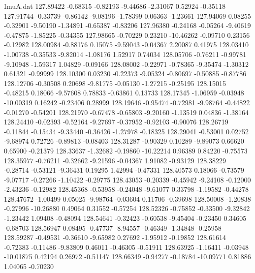 \begin{filecontents}{ImuA.dat}
 127.89422   -0.68315   -0.82193   -9.44686   -2.31067    0.52924   -0.35118
 127.91744   -0.33739   -0.86142   -9.08196   -1.78399    0.06363   -1.23661
 127.94069    0.08255   -0.32901   -9.50190   -1.34891   -0.65387   -0.83206
 127.96380   -0.24168   -0.05264   -9.40619   -0.47875   -1.85225   -0.34355
 127.98665   -0.70229    0.23210  -10.46262   -0.09710    0.23156   -0.12982
 128.00984   -0.88176    0.15075   -9.59043   -0.04367    2.20087    0.41975
 128.03410   -1.00738   -0.35533   -9.82014   -1.08176    1.52917    0.74034
 128.05706   -0.76211   -0.99781   -9.10948   -1.59317    1.04829   -0.09166
 128.08002   -0.22971   -0.78365   -9.35474   -1.30312    0.61321   -0.99999
 128.10300    0.03230   -0.22373   -9.05324   -0.80697   -0.50885   -0.87786
 128.12706   -0.30508    0.20698   -9.81775   -0.05130   -1.27215   -0.25195
 128.15015   -0.48215    0.18066   -9.57608    0.78833   -0.63861    0.13733
 128.17345   -1.06959   -0.03948  -10.00319    0.16242   -0.23406    0.28999
 128.19646   -0.95474   -0.72981   -9.98764   -0.44822   -0.01270   -0.54201
 128.21970   -0.67478   -0.65803   -9.20160   -1.13519    0.04836   -1.38164
 128.24410   -0.02393   -0.52164   -9.27697   -0.37952   -0.92103   -0.90076
 128.26719   -0.11844   -0.15434   -9.33440   -0.36426   -1.27978   -0.18325
 128.29041   -0.53001    0.02752   -9.68974    0.72726   -0.89813   -0.08403
 128.31287   -0.90329    0.10289   -9.89073    0.66620    0.65900   -0.21379
 128.33637   -1.32682   -0.19860  -10.22214    0.96389    0.84220   -0.75573
 128.35977   -0.76211   -0.32662   -9.21596   -0.04367    1.91082   -0.93129
 128.38229   -0.28714   -0.53121   -9.36431    0.19295    1.42994   -0.47331
 128.40573    0.18066   -0.73579   -9.07717   -0.27266   -1.10422   -0.29775
 128.43053   -0.20339   -0.45942   -9.24108   -0.12000   -2.43236   -0.12982
 128.45368   -0.53958   -0.24048   -9.61077    0.33798   -1.19582   -0.44278
 128.47672   -1.00499    0.05025   -9.98764   -0.03604    0.11706   -0.39698
 128.50008   -1.20838   -0.27996  -10.26880    0.49064    0.31552   -0.57254
 128.52326   -0.75852   -0.33500   -9.32842   -1.23442    1.09408   -0.48094
 128.54641   -0.32423   -0.60538   -9.45404   -0.23450    0.34605   -0.68703
 128.56947    0.08495   -0.47737   -8.94557   -0.46349   -1.34848   -0.25958
 128.59287   -0.49531   -0.36610   -9.65982    0.27692   -1.95912   -0.19852
 128.61614   -0.72383   -0.11486   -9.83809    0.46011   -0.46305   -0.51911
 128.63925   -1.16411   -0.03948  -10.01875    0.42194    0.26972   -0.51147
 128.66349   -0.94277   -0.18784  -10.09771    0.81886    1.04065   -0.70230

\end{filecontents}
